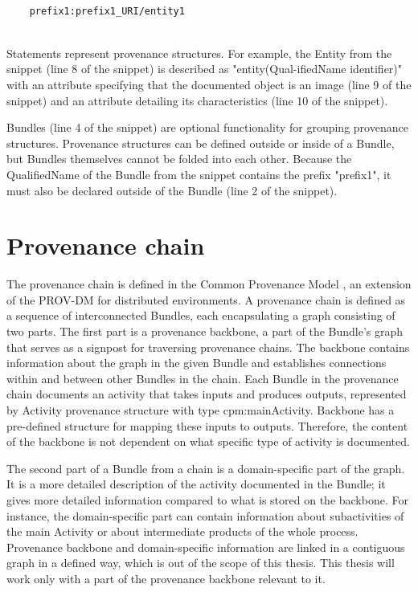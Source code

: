 \documentclass[
  digital,     %
  oneside,     %
  nosansbold,  %
  nocolorbold, %
  lof,         %
  lot,         %
]{fithesis4}
\begin{document}
\begin{verbatim}

    prefix1:prefix1_URI/entity1
    
\end{verbatim}

Statements represent provenance structures. For example, the Entity from the snippet (line 8 of the snippet) is described as "entity(Qual-ifiedName identifier)" with an attribute specifying that the documented object is an image (line 9 of the snippet) and an attribute detailing its characteristics (line 10 of the snippet).

Bundles (line 4 of the snippet) are optional functionality for grouping provenance structures. Provenance structures can be defined outside or inside of a Bundle, but Bundles themselves cannot be folded into each other. Because the QualifiedName of the Bundle from the snippet contains the prefix "prefix1", it must also be declared outside of the Bundle (line 2 of the snippet).
\shorthandon{-}

\section{Provenance chain} \label{s-provchain}
\shorthandoff{-}
The provenance chain is defined in the Common Provenance Model \cite{cpm}, an extension of the PROV-DM for distributed environments. A provenance chain is defined as a sequence of interconnected Bundles, each encapsulating a graph consisting of two parts. The first part is a provenance backbone, a part of the Bundle's graph that serves as a signpost for traversing provenance chains. The backbone contains information about the graph in the given Bundle and establishes connections within and between other Bundles in the chain. Each Bundle in the provenance chain documents an activity that takes inputs and produces outputs, represented by Activity provenance structure with type cpm:mainActivity. Backbone has a pre-defined structure for mapping these inputs to outputs. Therefore, the content of the backbone is not dependent on what specific type of activity is documented.

The second part of a Bundle from a chain is a domain-specific part of the graph. It is a more detailed description of the activity documented in the Bundle; it gives more detailed information compared to what is stored on the backbone. For instance, the domain-specific part can contain information about subactivities of the main Activity or about intermediate products of the whole process. Provenance backbone and domain-specific information are linked in a contiguous graph in a defined way, which is out of the scope of this thesis. This thesis will work only with a part of the provenance backbone relevant to it.
\end{document}
